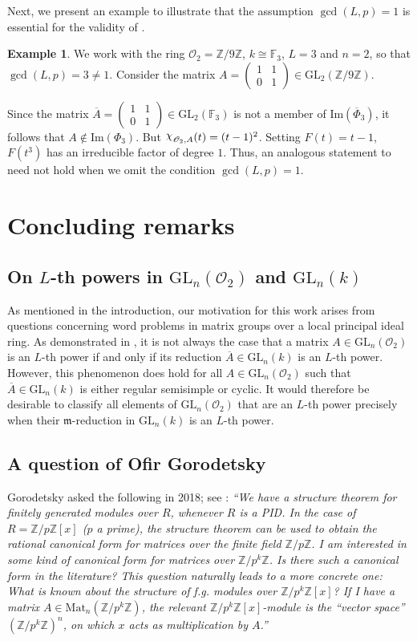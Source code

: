 \documentclass[11pt,twoside]{amsart}
\newcommand{\GL}{\mathrm{GL}}
\newcommand{\im}{\mathrm{Im}}
\newcommand{\upchi}{\raisebox{0.4ex}{$\chi$}}
\newcommand{\Char}{\upchi}
\newcommand{\R}{\mathscr{O}_2}
\theoremstyle{definition} %
\newtheorem{example}[lemma]{Example}
\begin{document}
Next, we present an example to illustrate that the assumption $\gcd(L, p) = 1$ is essential for the validity of .
\begin{example}
    We work with the ring $\R=\mathbb{Z}/9\mathbb{Z}$, $k\cong\mathbb{F}_3$, $L=3$ and $n=2$, so that $\gcd(L,p)=3\neq 1$. 
Consider the matrix $A= \begin{pmatrix}
 1 & 1 \\
0 & 1
\end{pmatrix} \in \GL_2(\mathbb{Z}/9\mathbb{Z})$.
\end{example}
Since the matrix $\overline{A}=\begin{pmatrix}
    1 & 1\\ 0 & 1
\end{pmatrix}\in\GL_2(\mathbb F_3)$ is not a member of $\im(\overline{\Phi}_3)$, it follows that $A\not\in\im(\Phi_3)$.
But $\Char_{\R,A}(t)=(t-1)^2$. Setting $F(t)=t-1$, $F(t^3)$ has an irreducible factor of degree $1$. 
Thus, an analogous statement to  need not hold when we omit the condition $\gcd(L,p)=1$.

\section{Concluding remarks}\label{res-conc-rem}
\subsection{On $L$-th powers in $\GL_n(\R)$ and $\GL_n(k)$}
As mentioned in the introduction, our motivation for this work arises from questions concerning word problems in matrix groups over a local principal ideal ring.
As demonstrated in , it is not always the case that a matrix $A \in \GL_n(\R)$ is an $L$-th power if and only if its reduction $\overline{A} \in \GL_n(k)$ is an $L$-th power.
However, this phenomenon does hold for all $A \in \GL_n(\R)$ such that $\overline{A} \in \GL_n(k)$ is either regular semisimple or cyclic.
It would therefore be desirable to classify all elements of $\GL_n(\R)$ that are an $L$-th power precisely when their $\mathfrak m$-reduction in $\GL_n(k)$ is an $L$-th power.
\subsection{A question of Ofir Gorodetsky
} Gorodetsky asked the following in 2018; see \cite{GorodetskyOverflow}:
\emph{``We have a structure theorem for finitely generated modules over $R$, whenever $R$ is a PID. In the case of $R=\mathbb{Z}/p\mathbb{Z}[x]$ ($p$ a prime), the structure theorem can be used to obtain the rational canonical form for matrices over the finite field $\mathbb{Z}/p\mathbb{Z}$. I am interested in some kind of canonical form for matrices over $\mathbb{Z}/p^k\mathbb{Z}$. Is there such a canonical form in the literature?
This question naturally leads to a more concrete one: What is known about the structure of f.g. modules over $\mathbb{Z}/p^k\mathbb{Z}[x]$?
If I have a matrix $A \in \mathrm{Mat}_n(\mathbb{Z}/p^k\mathbb{Z})$, the relevant $\mathbb{Z}/p^k\mathbb{Z}[x]$-module is the ``vector space'' $(\mathbb{Z}/p^k\mathbb{Z})^n$, on which $x$ acts as multiplication by $A$.”}
\end{document}
